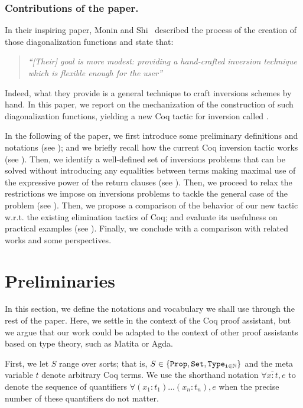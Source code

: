 \documentclass{llncs}
\begin{document}
\subsubsection{Contributions of the paper.} 
In their inspiring paper, Monin and Shi~\cite{monin-shi} described the
process of the creation of those diagonalization functions and state
that:
\begin{quote}
  \em ``[Their] goal is more modest: providing a hand-crafted
  inversion technique which is flexible enough for the
  user'' \end{quote}
%
Indeed, what they provide is a general technique to craft inversions
schemes by hand.  In this paper, we report on the mechanization of the
construction of such diagonalization functions, yielding a new Coq
tactic for inversion called .

In the following of the paper, we first introduce some preliminary
definitions and notations (see ); and we
briefly recall how the current Coq inversion tactic works (see
).
%
Then, we identify a well-defined set of inversions problems that can
be solved without introducing any equalities between terms making
maximal use of the expressive power of the return clauses (see
).
%
Then, we proceed to relax the restrictions we impose on inversions
problems to tackle the general case of the problem (see \secref{}).
%
Then, we propose a comparison of the behavior of our new 
tactic w.r.t. the existing elimination tactics of Coq; and evaluate
its usefulness on practical examples (see \secref{}).
%
Finally, we conclude with a comparison with related works and some
perspectives. 

\section{Preliminaries}\label{sec:preliminaries}
In this section, we define the notations and vocabulary we shall use
through the rest of the paper. Here, we settle in the context of the
Coq proof assistant, but we argue that our work could be adapted to
the context of other proof assistants based on type theory, such as
Matita or Agda.

\renewcommand\vector[1]{\overline{#1}} 

First, we let $S$ range over sorts; that is, $S \in \left\{\tt Prop,
  Set, Type_{i \in \mathbb{N}} \right\}$ and the meta variable $t$ denote
arbitrary Coq terms. We use the shorthand notation $\forall \vector{x
  : t},e$ to denote the sequence of quantifiers $\forall (x_1:t_1)
... (x_n:t_n),e$ when the precise number of these quantifiers do not
matter.
\end{document}
